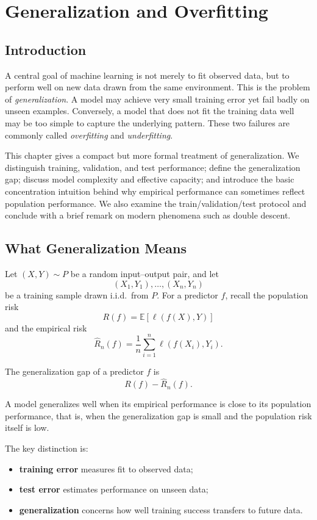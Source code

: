 \chapter{Generalization and Overfitting}

\section{Introduction}

A central goal of machine learning is not merely to fit observed data, but to perform well on new data drawn from the same environment. This is the problem of \emph{generalization}. A model may achieve very small training error yet fail badly on unseen examples. Conversely, a model that does not fit the training data well may be too simple to capture the underlying pattern. These two failures are commonly called \emph{overfitting} and \emph{underfitting}.

This chapter gives a compact but more formal treatment of generalization. We distinguish training, validation, and test performance; define the generalization gap; discuss model complexity and effective capacity; and introduce the basic concentration intuition behind why empirical performance can sometimes reflect population performance. We also examine the train/validation/test protocol and conclude with a brief remark on modern phenomena such as double descent.

\section{What Generalization Means}

Let $(X,Y)\sim P$ be a random input--output pair, and let
\[
(X_1,Y_1),\dots,(X_n,Y_n)
\]
be a training sample drawn i.i.d.\ from $P$. For a predictor $f$, recall the population risk
\[
R(f)=\mathbb{E}[\ell(f(X),Y)]
\]
and the empirical risk
\[
\widehat{R}_n(f)=\frac1n\sum_{i=1}^n \ell(f(X_i),Y_i).
\]

\begin{definition}
The generalization gap of a predictor $f$ is
\[
R(f)-\widehat{R}_n(f).
\]
\end{definition}

A model generalizes well when its empirical performance is close to its population performance, that is, when the generalization gap is small and the population risk itself is low.

The key distinction is:
\begin{itemize}
    \item \textbf{training error} measures fit to observed data;
    \item \textbf{test error} estimates performance on unseen data;
    \item \textbf{generalization} concerns how well training success transfers to future data.
\end{itemize}

